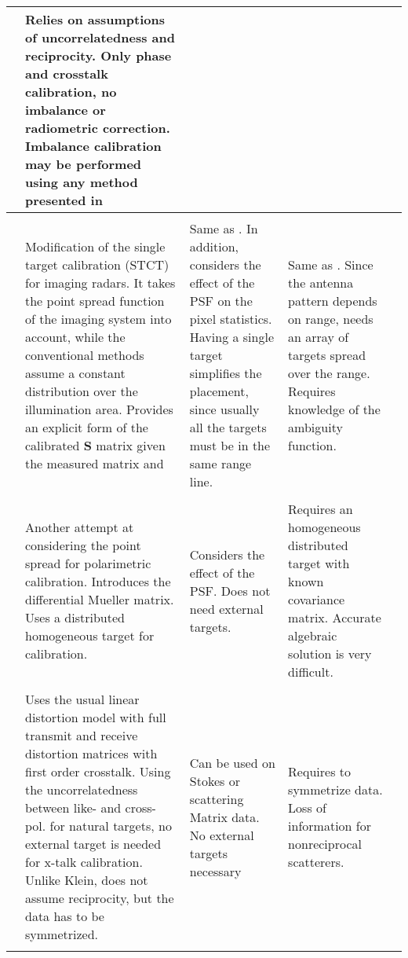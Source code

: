 \documentclass[11pt]{article}
\begin{document}
\begin{landscape}
\begin{longtable}{L{1cm}L{5cm}L{4cm}L{5cm}L{3cm}}
	& Relies on assumptions of uncorrelatedness and reciprocity. Only phase and crosstalk calibration, no imbalance or radiometric correction. Imbalance calibration may be performed using any method presented in \cite{Klein1992,575928,VanZyl1990}\\
	\hline\\
	\cite{Sarabandi1992}
	&Modification of the single target calibration (STCT) \cite{Sarabandi1990} for imaging radars. It takes the point spread function of the imaging system into account, while the conventional methods assume a constant distribution over the illumination area. Provides an explicit form of the calibrated $\mathbf{S}$ matrix given the measured matrix and
	&Same as \cite{Sarabandi1990}. In addition, considers the effect of the PSF on the pixel statistics. Having a single target simplifies the placement, since usually all the targets must be in the same range line.
	&Same as \cite{Sarabandi1990}. Since the antenna pattern depends on range, needs an array of targets spread over the range. Requires knowledge of the ambiguity function. \\
	\hline\\
	\cite{Sarabandi1994}
	&Another attempt at considering the point spread for polarimetric calibration. Introduces the differential Mueller matrix. Uses a distributed homogeneous target for calibration.
	&Considers the effect of the PSF. Does not need external targets.
	&Requires an homogeneous distributed target with known covariance matrix. Accurate algebraic solution is very difficult.
	\\
	\hline\\
	\cite{Freeman1992}&Uses the usual linear distortion model with full transmit and receive distortion matrices with first order crosstalk. Using the uncorrelatedness between like- and cross- pol. for natural targets, no external target is needed for x-talk calibration. Unlike Klein\cite{Klein1992}, does not assume reciprocity, but the data has to be symmetrized.
	&Can be used on Stokes or scattering Matrix data. No external targets necessary
	&Requires to symmetrize data. Loss of information for nonreciprocal scatterers.\\
	\hline\\
	

\end{longtable}
\end{landscape}
\end{document}
